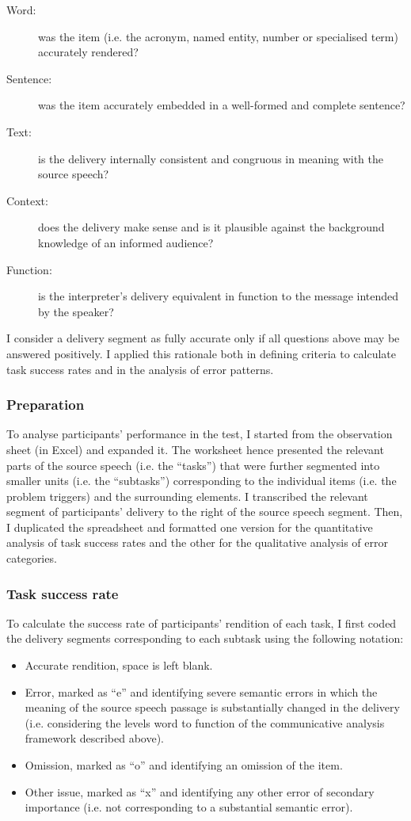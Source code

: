 \begin{description}
    \item[Word:] was the item (i.e. the acronym, named entity, number or specialised term) accurately rendered?
    \item[Sentence:] was the item accurately embedded in a well-formed and complete sentence?
    \item[Text:] is the delivery internally consistent and congruous in meaning with the source speech?
    \item[Context:] does the delivery make sense and is it plausible against the background knowledge of an informed audience?
    \item[Function:] is the interpreter’s delivery equivalent in function to the message intended by the speaker?
\end{description}

I consider a delivery segment as fully accurate only if all questions above may be answered positively. I applied this rationale both in defining criteria to calculate task success rates and in the analysis of error patterns.



\subsubsection{Preparation}


To analyse participants’ performance in the test, I started from the observation sheet (in Excel) and expanded it. The worksheet hence presented the relevant parts of the source speech (i.e. the ``tasks'') that were further segmented into smaller units (i.e. the ``subtasks'') corresponding to the individual items (i.e. the problem triggers) and the surrounding elements. I transcribed the relevant segment of participants’ delivery to the right of the source speech segment. Then, I duplicated the spreadsheet and formatted one version for the quantitative analysis of task success rates and the other for the qualitative analysis of error categories.


\subsubsection{Task success rate}

To calculate the success rate of participants’ rendition of each task, I first coded the delivery segments corresponding to each subtask using the following notation:
\begin{itemize}
    \item Accurate rendition, space is left blank.
\item Error, marked as ``e'' and identifying severe semantic errors in which the meaning of the source speech passage is substantially changed in the delivery (i.e. considering the levels word to function of the communicative analysis framework described above).
\item Omission, marked as ``o'' and identifying an omission of the item.
\item Other issue, marked as ``x'' and identifying any other error of secondary importance (i.e. not corresponding to a substantial semantic error).
\end{itemize}


